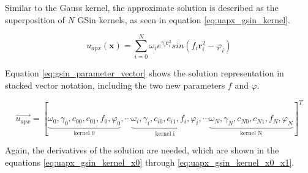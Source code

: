 \documentclass[./\jobname.tex]{subfiles}
\begin{document}
\begin{figure}[H]
	\centering
	\noindent{}
	\label{fig:gsin_kernel_3d_plot}
\end{figure}

Similar to the Gauss kernel, the approximate solution is described as the superposition of $N$ GSin kernels, as seen in equation \ref{eq:uapx_gsin_kernel}. 

\begin{equation}
\label{eq:uapx_gsin_kernel}
u_{apx}(\mathbf{x}) = \sum_{i=0}^{N} \omega_i e^{\gamma_i \mathbf{r}_i^2} sin(f_i \mathbf{r}_i^2 - \varphi_i)
\end{equation}

Equation \ref{eq:gsin_parameter_vector} shows the solution representation in stacked vector notation, including the two new parameters $f$ and $\varphi$. 

\begin{equation}
\label{eq:gsin_parameter_vector}
\vec{u_{apx}} = \left[\underbrace{\omega_0, \gamma_0, c_{00}, c_{01}, f_0, \varphi_0}_{\text{kernel 0}}, \cdots \underbrace{\omega_i, \gamma_i, c_{i0}, c_{i1}, f_i, \varphi_i}_{\text{kernel i}}, \cdots \underbrace{\omega_N, \gamma_N, c_{N0}, c_{N1}, f_N, \varphi_N}_{\text{kernel N}} \right]^T
\end{equation}

Again, the derivatives of the solution are needed, which are shown in the equations \ref{eq:uapx_gsin_kernel_x0} through \ref{eq:uapx_gsin_kernel_x0_x1}. 
\end{document}
